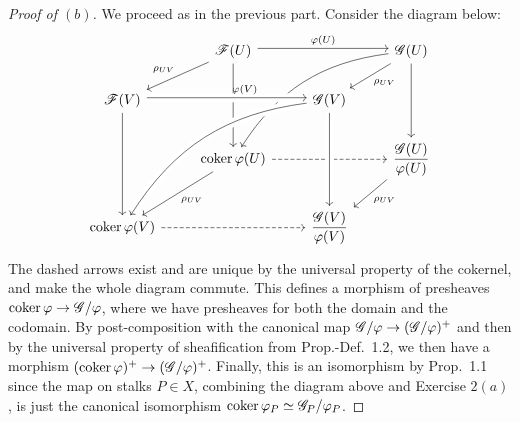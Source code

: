 \documentclass[10pt]{article}
\theoremstyle{definition}
\theoremstyle{remark}
\numberwithin{equation}{section}
\numberwithin{figure}{subsubsection}
\let\Im\relax
\DeclareMathOperator{\Im}{im}
\DeclareMathOperator{\Coker}{coker}
\begin{document}
\begin{proof}[Proof of $(b)$]
  We proceed as in the previous part. Consider the diagram below:
  \begin{equation*}
    \begin{tikzcd}[baseline={([yshift=1.25em]current bounding box.south)}]
      & \mathscr{F}(U) \arrow[yshift=2pt]{rr}{\varphi(U)}
      \arrow{dl}[swap]{\rho_{UV}} \arrow{dd} & & \mathscr{G}(U)
      \arrow[crossing over]{dl}{\rho_{UV}}
      \arrow[bend right=25]{ddll}\\
      \mathscr{F}(V) \arrow{dd}
      & & \mathscr{G}(V)\arrow[bend right=25,crossing over]{ddll}
      \arrow[crossing over,leftarrow,yshift=2pt]{ll}[xshift=3ex,swap]{\varphi(V)}\\
      & \Coker\varphi(U)\arrow[dashed]{rr}
      \arrow{dl}{\rho_{UV}} & & \dfrac{\mathscr{G}(U)}{\Im\varphi(U)}
      \arrow[leftarrow]{uu}
      \arrow{dl}{\rho_{UV}}\\
      \Coker\varphi(V)\arrow[dashed]{rr}
      & & \dfrac{\mathscr{G}(V)}{\Im\varphi(V)}
      \arrow[crossing over,leftarrow]{uu}
    \end{tikzcd}
  \end{equation*}
  The dashed arrows exist and are unique by the universal property of the
  cokernel, and make the whole diagram commute. This defines a morphism of
  presheaves $\Coker \varphi \to \mathscr{G}/\Im\varphi$, where we have
  presheaves for both the domain and the codomain. By post-composition with the
  canonical map $\mathscr{G}/\Im\varphi \to (\mathscr{G}/\Im\varphi)^+$ and then
  by the universal property of sheafification from Prop.-Def.~1.2, we then have
  a morphism $(\Coker \varphi)^+ \to (\mathscr{G}/\Im\varphi)^+$. Finally, this
  is an isomorphism by Prop.~1.1 since the map on stalks $P \in X$, combining the
  diagram above and Exercise $2(a)$, is just the canonical isomorphism $\Coker
  \varphi_P \simeq \mathscr{G}_P/\Im\varphi_P$.
\end{proof}
\end{document}
